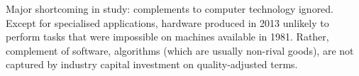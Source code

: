 \documentclass[a4paper,11pt]{article}
\begin{document}



Major shortcoming in study: complements to computer technology ignored. Except for specialised applications, hardware produced in 2013 unlikely to perform tasks that were impossible on machines available in 1981. Rather, complement of software, algorithms (which are usually non-rival goods), are not captured by industry capital investment on quality-adjusted terms.



\printbibliography
\end{document}

